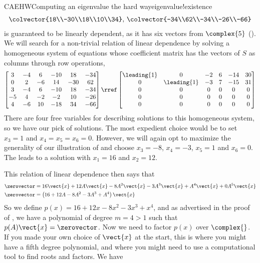 \begin{example}{CAEHW}{Computing an eigenvalue the hard way}{eigenvalue!existence}
\begin{align*}
{\colvector{18\\-30\\18\\10\\34},\,
\colvector{-34\\62\\-34\\-26\\-66}
}
\end{align*}
%
is guaranteed to be linearly dependent, as it has six vectors from $\complex{5}$ ().  We will search for a non-trivial relation of linear dependence by solving a homogeneous system of equations whose coefficient matrix has the vectors of $S$ as columns through row operations,
%
\begin{equation*}
\begin{bmatrix}
3 & -4 & 6 & -10 & 18 & -34\\
0 & 2 & -6 & 14 & -30 & 62\\
3 & -4 & 6 & -10 & 18 & -34\\
-5 & 4 & -2 & -2 & 10 & -26\\
4 & -6 & 10 & -18 & 34 & -66
\end{bmatrix}
\rref
\begin{bmatrix}
\leading{1} & 0 & -2 & 6 & -14 & 30\\
0 & \leading{1} & -3 & 7 & -15 & 31\\
0 & 0 & 0 & 0 & 0 & 0\\
0 & 0 & 0 & 0 & 0 & 0\\
0 & 0 & 0 & 0 & 0 & 0
\end{bmatrix}
\end{equation*}
%
There are four free variables for describing solutions to this homogeneous system, so we have our pick of solutions.  The most expedient choice would be to set $x_3=1$ and $x_4=x_5=x_6=0$.  However, we will again opt to maximize the generality of our illustration of  and choose $x_3=-8$, $x_4=-3$, $x_5=1$ and $x_6=0$.  The leads to a solution with $x_1=16$ and $x_2=12$.\par
%
This relation of linear dependence then says that
%
\begin{align*}
\zerovector&=16\vect{x}+12A\vect{x}-8A^2\vect{x}-3A^3\vect{x}+A^4\vect{x}+0A^5\vect{x}\\
\zerovector&=\left(16+12A-8A^2-3A^3+A^4\right)\vect{x}
\end{align*}
%
So we define $p(x)=16+12x-8x^2-3x^3+x^4$, and as advertised in the proof of , we have a polynomial of degree $m=4>1$ such that $p(A)\vect{x}=\zerovector$.  Now we need to factor $p(x)$ over $\complex{\null}$.  If you made your own choice of $\vect{x}$ at the start, this is where you might have a fifth degree polynomial, and where you might need to use a computational tool to find roots and factors.  We have

\end{example}
